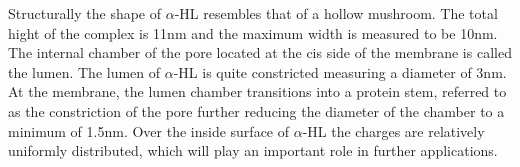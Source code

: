 Structurally the shape of $\alpha$-HL resembles that of a hollow mushroom. The total
hight of the complex is 11nm and the maximum width is measured to be 10nm. The internal
chamber of the pore located at the cis side of the membrane is called the lumen.
The lumen of $\alpha$-HL is quite constricted measuring a diameter of 3nm. At the
membrane, the lumen chamber transitions into a protein stem, referred to as the
constriction of the pore further reducing the diameter of the chamber to a minimum of
1.5nm. Over the inside surface of  $\alpha$-HL the charges are relatively uniformly
distributed, which will play an important role in further applications.

%
%
%
%

